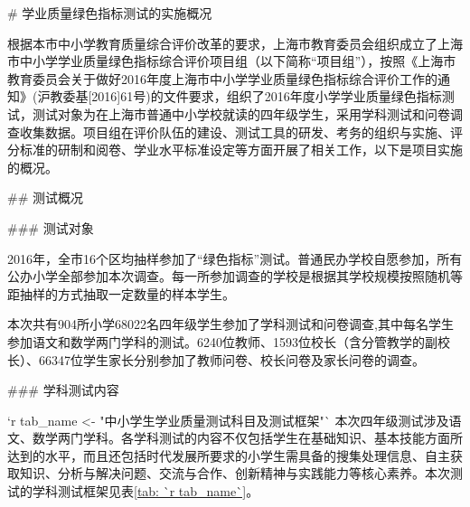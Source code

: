 # 学业质量绿色指标测试的实施概况

根据本市中小学教育质量综合评价改革的要求，上海市教育委员会组织成立了上海市中小学学业质量绿色指标综合评价项目组（以下简称“项目组”），按照《上海市教育委员会关于做好2016年度上海市中小学学业质量绿色指标综合评价工作的通知》(沪教委基[2016]61号)的文件要求，组织了2016年度小学学业质量绿色指标测试，测试对象为在上海市普通中小学校就读的四年级学生，采用学科测试和问卷调查收集数据。项目组在评价队伍的建设、测试工具的研发、考务的组织与实施、评分标准的研制和阅卷、学业水平标准设定等方面开展了相关工作，以下是项目实施的概况。

## 测试概况

### 测试对象

2016年，全市16个区均抽样参加了“绿色指标”测试。普通民办学校自愿参加，所有公办小学全部参加本次调查。每一所参加调查的学校是根据其学校规模按照随机等距抽样的方式抽取一定数量的样本学生。

本次共有904所小学68022名四年级学生参加了学科测试和问卷调查,其中每名学生参加语文和数学两门学科的测试。6240位教师、1593位校长（含分管教学的副校长）、66347位学生家长分别参加了教师问卷、校长问卷及家长问卷的调查。

### 学科测试内容

`r tab_name <- "中小学生学业质量测试科目及测试框架"`
本次四年级测试涉及语文、数学两门学科。各学科测试的内容不仅包括学生在基础知识、基本技能方面所达到的水平，而且还包括时代发展所要求的小学生需具备的搜集处理信息、自主获取知识、分析与解决问题、交流与合作、创新精神与实践能力等核心素养。本次测试的学科测试框架见表\ref{tab: `r tab_name`}。

